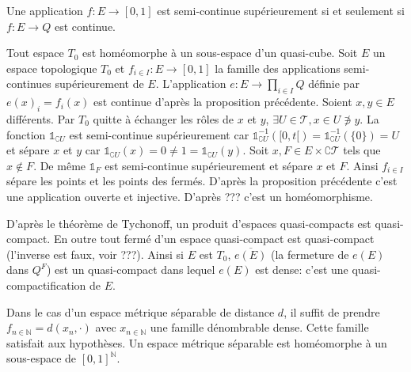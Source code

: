 \documentclass[a4paper, 11pt, french]{book}
\theoremstyle{plain} %
\theoremstyle{definition} %
\theoremstyle{remark} %
\newcommand{\1}{\mathds{1}}
\newcommand{\inv}[1]{#1^{-1}}
\newcommand{\N}{\mathbb{N}}
\begin{document}
Une application $f:E\rightarrow[0, 1]$ est semi-continue supérieurement si et seulement si $f:E\rightarrow Q$ est continue.

\proposition
Tout espace $T_0$ est homéomorphe à un sous-espace d'un quasi-cube.
\demonstration
Soit $E$ un espace topologique $T_0$ et $f_{i\in I}:E\rightarrow [0, 1]$ la famille des applications semi-continues supérieurement de $E$.
L'application $e:E\rightarrow \prod_{i\in I}Q$ définie par $e(x)_i=f_i(x)$ est continue d'après la proposition précédente.
Soient $x, y\in E$ différents.
Par $T_0$ quitte à échanger les rôles de $x$ et $y$, $\exists U\in\mathscr{T}, x\in U\not\ni y$.
La fonction $\1_{\complement U}$ est semi-continue supérieurement car $\inv{\1_{\complement U}}([0, t[)=\inv{\1_{\complement U}}(\{0\})=U$ et sépare $x$ et $y$ car $\1_{\complement U}(x)=0\neq1=\1_{\complement U}(y)$.
Soit $x, F\in E\times\complement\mathscr{T}$ tels que $x\notin F$.
De même $\1_F$ est semi-continue supérieurement et sépare $x$ et $F$.
Ainsi $f_{i\in I}$ sépare les points et les points des fermés.
D'après la proposition précédente c'est une application ouverte et injective.
D'après {\color{red} ???} c'est un homéomorphisme.

\remarque
D'après le théorème de Tychonoff, un produit d'espaces quasi-compacts est quasi-compact.
En outre tout fermé d'un espace quasi-compact  est quasi-compact (l'inverse est faux, voir {\color{red} ???}).
Ainsi si $E$ est $T_0$, $\overline{e(E)}$ (la fermeture de $e(E)$ dans $Q^F$) est un quasi-compact dans lequel $e(E)$ est dense: c'est une quasi-compactification de $E$.

\remarque
Dans le cas d'un espace métrique séparable de distance $d$, il suffit de prendre $f_{n\in\N}=d(x_n, \cdot)$ avec $x_{n\in\N}$ une famille dénombrable dense.
Cette famille satisfait aux hypothèses.
Un espace métrique séparable est homéomorphe à un sous-espace de $[0, 1]^\N$.
\end{document}
